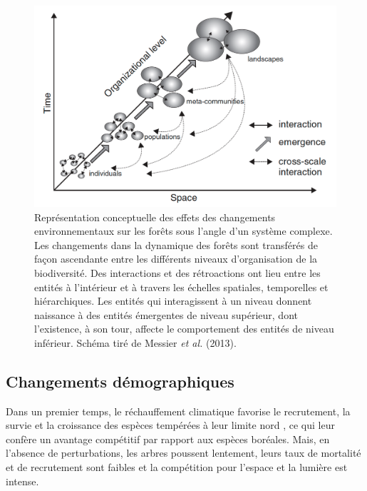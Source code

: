 \begin{figure}
\centering
\includegraphics[width=.8\textwidth]{conclusion/figures/complex.png}
\caption[Représentation conceptuelle des effets des changements environnementaux sur les différents niveaux d'organisation de la biodiversité]{Représentation conceptuelle des effets des changements environnementaux sur les forêts sous l'angle d'un système complexe. Les changements dans la dynamique des forêts sont transférés de façon ascendante entre les différents niveaux d'organisation de la biodiversité. Des interactions et des rétroactions ont lieu entre les entités à l'intérieur et à travers les échelles spatiales, temporelles et hiérarchiques. Les entités qui interagissent à un niveau donnent naissance à des entités émergentes de niveau supérieur, dont l'existence, à son tour, affecte le comportement des entités de niveau inférieur. Schéma tiré de Messier \emph{et al.} (2013).}
\label{fig4.2}
\end{figure}

\hypertarget{changements-duxe9mographiques}{%
\subsection{Changements
démographiques}\label{changements-duxe9mographiques}}

Dans un premier temps, le réchauffement climatique favorise le
recrutement, la survie et la croissance des espèces tempérées à leur
limite nord
\citep{boisvertmarsh_divergent_2019, bolte_understory_2014, fisichelli_temperate_2014, goldblum_tree_2005, grundmann_impact_2011},
ce qui leur confère un avantage compétitif par rapport aux espèces
boréales. Mais, en l'absence de perturbations, les arbres poussent
lentement, leurs taux de mortalité et de recrutement sont faibles et la
compétition pour l'espace et la lumière est intense.

